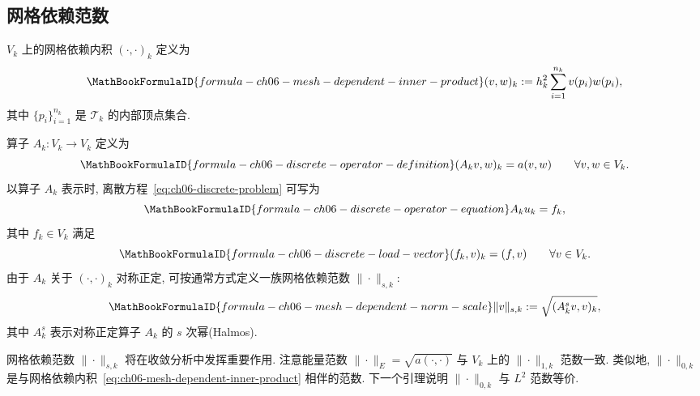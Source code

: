 \subsection{网格依赖范数}
\label{sec:ch06-mesh-dependent-norms}
\setcounter{thmcount}{0}
\setcounter{equation}{0}

\begin{Definition}[网格依赖内积]
\label{def:ch06-mesh-dependent-inner-product}
$V_k$ 上的网格依赖内积 $(\cdot,\cdot)_k$ 定义为
\begin{equation}
\MathBookFormulaID{formula-ch06-mesh-dependent-inner-product}
\label{eq:ch06-mesh-dependent-inner-product}
(v,w)_k:=h_k^2\sum_{i=1}^{n_k}v(p_i)w(p_i),
\end{equation}
其中 $\{p_i\}_{i=1}^{n_k}$ 是 $\mathcal T_k$ 的内部顶点集合.
\end{Definition}

算子 $A_k:V_k\longrightarrow V_k$ 定义为
\begin{equation}
\MathBookFormulaID{formula-ch06-discrete-operator-definition}
\label{eq:ch06-discrete-operator-definition}
(A_kv,w)_k=a(v,w)\qquad\forall v,w\in V_k.
\end{equation}
以算子 $A_k$ 表示时, 离散方程~\eqref{eq:ch06-discrete-problem} 可写为
\begin{equation}
\MathBookFormulaID{formula-ch06-discrete-operator-equation}
\label{eq:ch06-discrete-operator-equation}
A_ku_k=f_k,
\end{equation}
其中 $f_k\in V_k$ 满足
\begin{equation}
\MathBookFormulaID{formula-ch06-discrete-load-vector}
\label{eq:ch06-discrete-load-vector}
(f_k,v)_k=(f,v)\qquad\forall v\in V_k.
\end{equation}
由于 $A_k$ 关于 $(\cdot,\cdot)_k$ 对称正定, 可按通常方式定义一族网格依赖范数 $\|\cdot\|_{s,k}$:
\begin{equation}
\MathBookFormulaID{formula-ch06-mesh-dependent-norm-scale}
\label{eq:ch06-mesh-dependent-norm-scale}
\|v\|_{s,k}:=\sqrt{(A_k^sv,v)_k},
\end{equation}
其中 $A_k^s$ 表示对称正定算子 $A_k$ 的 $s$ 次幂(Halmos).

网格依赖范数 $\|\cdot\|_{s,k}$ 将在收敛分析中发挥重要作用. 注意能量范数 $\|\cdot\|_E=\sqrt{a(\cdot,\cdot)}$ 与 $V_k$ 上的 $\|\cdot\|_{1,k}$ 范数一致. 类似地, $\|\cdot\|_{0,k}$ 是与网格依赖内积~\eqref{eq:ch06-mesh-dependent-inner-product} 相伴的范数. 下一个引理说明 $\|\cdot\|_{0,k}$ 与 $L^2$ 范数等价.

